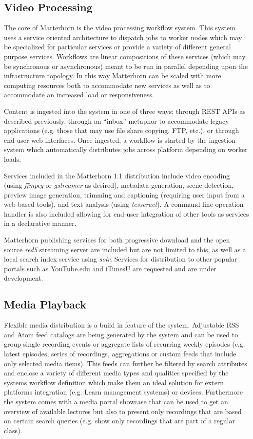 \documentclass{sig-alternate}
\begin{document}
\subsection{Video Processing}
The core of Matterhorn is the video processing workflow system.  This system uses a service oriented architecture to dispatch jobs to worker nodes which may be specialized for particular services or provide a variety of different general purpose services.  Workflows are linear compositions of these services (which may be synchronous or asynchronous) meant to be run in parallel depending upon the infrastructure topology.  In this way Matterhorn can be scaled with more computing resources both to accommodate new services as well as to accommodate an increased load or responsiveness.

Content is ingested into the system in one of three ways; through REST APIs as described previously, through an ``inbox'' metaphor to accommodate legacy applications (e.g. those that may use file share copying, FTP, etc.), or through end-user web interfaces.  Once ingested, a workflow is started by the ingestion system which automatically distributes jobs across platform depending on worker loads.

Services included in the Matterhorn 1.1 distribution include video encoding (using \emph{ffmpeg} or \emph{gstreamer} as desired), metadata generation, scene detection, preview image generation, trimming and captioning (requiring user input from a web-based tools), and text analysis (using \emph{tesseract}).  A command line operation handler is also included allowing for end-user integration of other tools as services in a declarative manner.

Matterhorn publishing services for both progressive download and the open source \emph{red5} streaming server are included but are not limited to this, as well as a local search index service using \emph{solr}.  Services for distribution to other popular portals such as YouTube.edu and iTunesU are requested and are under development.

\subsection{Media Playback}
Flexible media distribution is a build in feature of the system. Adjustable RSS and Atom feed catalogs are being generated by the system and can be used to group single recording events or aggregate lists of recurring weekly episodes (e.g. latest episodes, series of recordings, aggregations or custom feeds that include only selected media items). This feeds can further be filtered by search attributes and enclose a variety of different media types and qualities specified by the systems workflow definition which make them an ideal solution for extern platforms integration (e.g. Learn management systems) or devices. Furthermore the system comes with a media portal showcase that can be used to get an overview of available lectures but also to present only recordings that are based on certain search queries (e.g. show only recordings that are part of a regular class).
\end{document}
